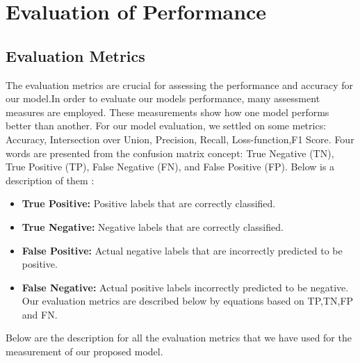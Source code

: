 \section{Evaluation of Performance}
\subsection{Evaluation Metrics}
The evaluation metrics are crucial for assessing the performance and accuracy for our model.In order to evaluate our models performance, many assessment measures are
employed. These measurements show how one model performs better than another. For our model evaluation, we settled on some metrics: Accuracy, Intersection over Union, Precision, Recall, Loss-function,F1 Score. Four words are presented from the confusion
matrix concept: True Negative (TN), True Positive (TP), False Negative (FN),
and False Positive (FP). Below is a description of them : \\ 

\begin{itemize}
    \item \textbf{True Positive: }Positive labels that are correctly classified.
    \item \textbf{True Negative: }Negative labels that are correctly classified.
    \item \textbf{False Positive: }Actual negative labels that are incorrectly predicted to be positive.
    \item \textbf{False Negative: }Actual positive labels incorrectly predicted to be negative. Our evaluation metrics are described below by equations based on TP,TN,FP and FN.
\end{itemize}

Below are the description for all the evaluation metrics that we have used for the measurement of our proposed model.

